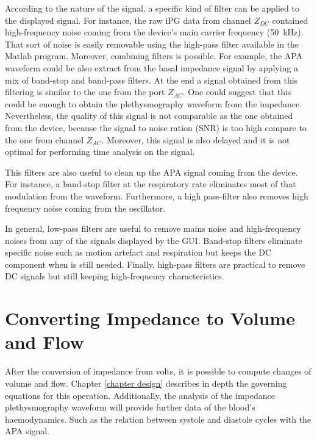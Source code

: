 According to the nature of the signal, a specific kind of filter can be applied to the displayed signal. For instance, the raw iPG data from channel $Z_{DC}$ contained high-frequency noise coming from the device's main carrier frequency (\SI{50}{\kilo\hertz}). That sort of noise is easily removable using the high-pass filter available in the Matlab program. Moreover, combining filters is possible. For example, the APA waveform could be also extract from the basal impedance signal by applying a mix of band-stop and band-pass filters. At the end a signal obtained from this filtering is similar to the one from the port $Z_{AC}$. One could suggest that this could be enough to obtain the plethysmography waveform from the impedance. Nevertheless, the quality of this signal is not comparable as the one obtained from the device, because the signal to noise ration (SNR)  is too high compare to the one from channel $Z_{AC}$. Moreover, this signal is also delayed and it is not optimal for performing time analysis on the signal. 

This filters are also useful to clean up the APA signal coming from the device. For instance, a band-stop filter at the respiratory rate eliminates most of that modulation from the waveform. Furthermore, a high pass-filter also removes high frequency noise coming from the oscillator.

In general, low-pass filters are useful to remove mains noise and high-frequency noises from any of the signals displayed by the GUI. Band-stop filters eliminate specific noise such as motion artefact and respiration but keeps the DC component when is still needed. Finally, high-pass filters are practical to remove DC signals but still keeping high-frequency characteristics.


\section{Converting Impedance to Volume and Flow}
\label{section procedure 4}

After the conversion of impedance from volts, it is possible to compute changes of volume and flow. Chapter \ref{chapter design} describes in depth the governing equations for this operation. Additionally, the analysis of the impedance plethysmography waveform will provide further data of the blood's haemodynamics. Such as the relation between systole and diastole cycles with the APA signal.

